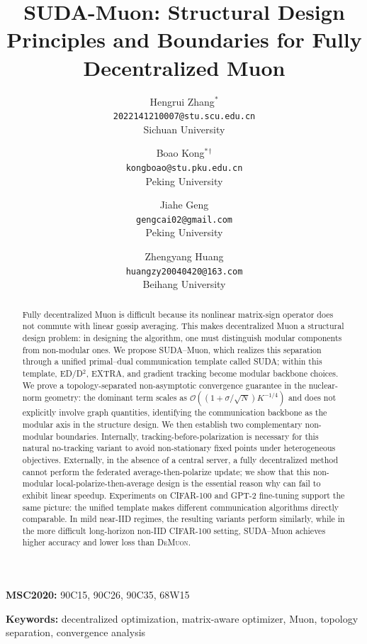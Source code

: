 \documentclass{article}
\title{SUDA-Muon: Structural Design Principles and Boundaries for Fully Decentralized Muon}
\author{
  Hengrui Zhang$^*$ \\
  \texttt{2022141210007@stu.scu.edu.cn} \\
  Sichuan University \\
  \and
  Boao Kong$^*$$^\dagger$\\
  \texttt{kongboao@stu.pku.edu.cn} \\
  Peking University \\
  \and
  Jiahe Geng \\
  \texttt{gengcai02@gmail.com} \\
  Peking University \\
  \and
  Zhengyang Huang\\
  \texttt{huangzy20040420@163.com} \\
  Beihang University \\
}
\newcommand{\sudamuon}{SUDA--Muon}
\begin{document}
\setlength{\parindent}{0pt}
\setlength{\parskip}{0.5em}
\maketitle


\def\thefootnote{$^*$}
\def\thefootnote{$^\dagger$}

\begin{abstract}
Fully decentralized Muon is difficult because its nonlinear matrix-sign operator does not commute with linear gossip averaging. This makes decentralized Muon a structural design problem: in designing the algorithm, one must distinguish modular components from non-modular ones. We propose \sudamuon{}, which realizes this separation through a unified primal--dual communication template called SUDA; within this template, ED/D$^2$, EXTRA, and gradient tracking become modular backbone choices. We prove a topology-separated non-asymptotic convergence guarantee in the nuclear-norm geometry: the dominant term scales as $\mathcal{O}((1+\sigma/\sqrt{N})K^{-1/4})$ and does not explicitly involve graph quantities, identifying the communication backbone as the modular axis in the structure design. We then establish two complementary non-modular boundaries. Internally, tracking-before-polarization is necessary for this natural no-tracking variant to avoid non-stationary fixed points under heterogeneous objectives. Externally, in the absence of a central server, a fully decentralized method cannot perform the federated average-then-polarize update; we show that this non-modular local-polarize-then-average design is the essential reason why can fail to exhibit linear speedup. Experiments on CIFAR-100 and GPT-2 fine-tuning support the same picture: the unified template makes different communication algorithms directly comparable. In mild near-IID regimes, the resulting variants perform similarly, while in the more difficult long-horizon non-IID CIFAR-100 setting, \sudamuon{} achieves higher accuracy and lower loss than \textsc{DeMuon}.
\end{abstract}

\noindent\textbf{MSC2020:} 90C15, 90C26, 90C35, 68W15

\noindent\textbf{Keywords:} decentralized optimization, matrix-aware optimizer, Muon, topology separation, convergence analysis

\newpage

{\small
\tableofcontents}
\end{document}
